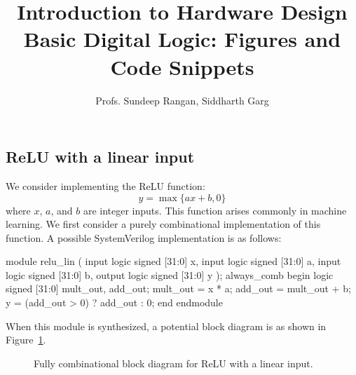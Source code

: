 \documentclass[11pt]{article}
\begin{document}
\title{Introduction to Hardware Design\\
Basic Digital Logic:  Figures and Code Snippets}
\author{Profs. Sundeep Rangan, Siddharth Garg}
\date{}

\maketitle

\subsection{ ReLU with a linear input}

We consider implementing the ReLU function:
  \[
    y = \max\{ ax + b, 0\}
  \]
  where $x$, $a$, and $b$ are integer inputs.  This function arises commonly
  in machine learning.
  We first consider a purely combinational implementation of this function.
  A possible SystemVerilog implementation is as follows:

\begin{systemverilogcode}
    module relu_lin (
      input logic signed [31:0] x,
      input logic signed [31:0] a,
      input logic signed [31:0] b,
      output logic signed [31:0] y
    );
      always_comb begin
        logic signed [31:0] mult_out, add_out;
        mult_out = x * a;
        add_out = mult_out + b;
        y = (add_out > 0) ? add_out : 0;
      end
    endmodule
  \end{systemverilogcode}

  When this module is synthesized, a potential block diagram is as shown in
  Figure~\ref{fig:relu_comb}.

  
\begin{figure}
\centering

  \caption{Fully combinational block diagram for ReLU with a linear input.}
  \label{fig:relu_comb}
\end{figure}
\end{document}
